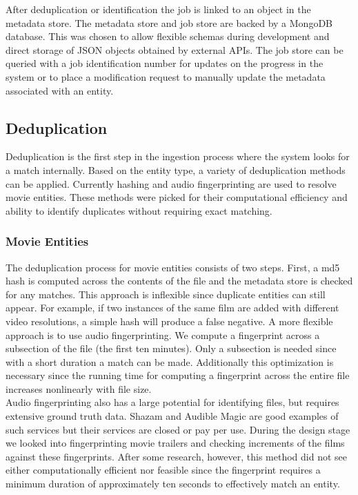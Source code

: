 \documentclass[paper=a4, fontsize=11pt]{scrartcl} %
\numberwithin{equation}{section} %
\numberwithin{figure}{section} %
\numberwithin{table}{section} %
\begin{document}
After deduplication or identification the job is linked to an object in the metadata store. The metadata store and job store are backed by a MongoDB database. This was chosen to allow flexible schemas during development and direct storage of JSON objects obtained by external APIs. The job store can be queried with a job identification number for updates on the progress in the system or to place a modification request to manually update the metadata associated with an entity. \\


\subsection{Deduplication}
\label{sec:deduplication}
Deduplication is the first step in the ingestion process where the system looks for a match internally. Based on the entity type, a variety of deduplication methods can be applied. Currently hashing and audio fingerprinting are used to resolve movie entities. These methods were picked for their computational efficiency and ability to identify duplicates without requiring exact matching. \\

\subsubsection{Movie Entities}
\label{sec:dedup-movie-entities}
The deduplication process for movie entities consists of two steps. First, a md5 hash is computed across the contents of the file and the metadata store is checked for any matches. This approach is inflexible since duplicate entities can still appear. For example, if two instances of the same film are added with different video resolutions, a simple hash will produce a false negative. A more flexible approach is to use audio fingerprinting. We compute a fingerprint across a subsection of the file (the first ten minutes). Only a subsection is needed since with a short duration a match can be made. Additionally this optimization is necessary since the running time for computing a fingerprint across the entire file increases nonlinearly with file size. \\

Audio fingerprinting also has a large potential for identifying files, but requires extensive ground truth data. Shazam and Audible Magic are good examples of such services but their services are closed or pay per use. During the design stage we looked into fingerprinting movie trailers and checking increments of the films against these fingerprints. After some research, however, this method did not see either computationally efficient nor feasible since the fingerprint requires a minimum duration of approximately ten seconds to effectively match an entity. \\
\end{document}
